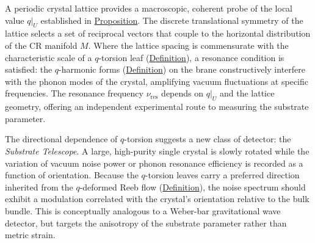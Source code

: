 \begin{remark}
  \label{rem:crystal-probe-q}
A periodic crystal lattice provides a macroscopic, coherent probe of the
local value $q|_U$ established in
\hyperref[prop:local-substrate-q]{Proposition}. The discrete translational
symmetry of the lattice selects a set of reciprocal vectors that couple to
the horizontal distribution of the CR manifold $M$. Where the lattice
spacing is commensurate with the characteristic scale of a $q$-torsion leaf
(\hyperref[def:q-torsion-leaf]{Definition}), a resonance condition is satisfied:
the $q$-harmonic forms (\hyperref[def:q-harmonic-form]{Definition}) on the brane
constructively interfere with the phonon modes of the crystal, amplifying
vacuum fluctuations at specific frequencies. The resonance frequency
$\nu_{\mathrm{res}}$ depends on $q|_U$ and the lattice geometry, offering
an independent experimental route to measuring the substrate parameter.
\end{remark}

\begin{remark}
  \label{rem:substrate-telescope}
The directional dependence of $q$-torsion suggests a new class of detector:
the \emph{Substrate Telescope}. A large, high-purity single crystal is
slowly rotated while the variation of vacuum noise power or phonon resonance
efficiency is recorded as a function of orientation. Because the $q$-torsion
leaves carry a preferred direction inherited from the $q$-deformed Reeb flow
(\hyperref[def:q-reeb-flow]{Definition}), the noise spectrum should exhibit a
modulation correlated with the crystal's orientation relative to the bulk
bundle. This is conceptually analogous to a Weber-bar gravitational wave
detector, but targets the anisotropy of the substrate parameter rather than
metric strain.
\end{remark}

